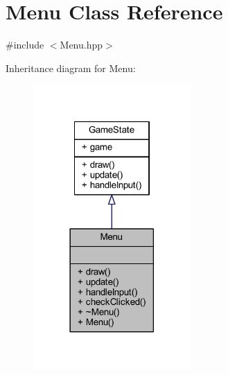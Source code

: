 \hypertarget{class_menu}{}\section{Menu Class Reference}
\label{class_menu}


{\ttfamily \#include $<$Menu.\+hpp$>$}



Inheritance diagram for Menu\+:
\nopagebreak
\begin{figure}[H]
\begin{center}
\leavevmode
\includegraphics[width=170pt]{class_menu__inherit__graph}
\end{center}
\end{figure}


